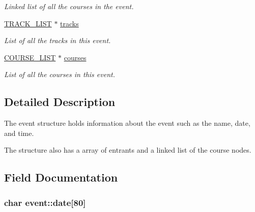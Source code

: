 \begin{DoxyCompactItemize}
\begin{DoxyCompactList}\small\item\em Linked list of all the courses in the event. \end{DoxyCompactList}\item 
\hypertarget{structevent_a8cdc68cd442a8388a43fd6ace1b60024}{\hyperlink{track_8h_a74548625073be9665a690d126e4daf4f}{T\-R\-A\-C\-K\-\_\-\-L\-I\-S\-T} $\ast$ \hyperlink{structevent_a8cdc68cd442a8388a43fd6ace1b60024}{tracks}}\label{structevent_a8cdc68cd442a8388a43fd6ace1b60024}

\begin{DoxyCompactList}\small\item\em List of all the tracks in this event. \end{DoxyCompactList}\item 
\hypertarget{structevent_a23dbac353abd557d37ce84982fb80f47}{\hyperlink{course_8h_aa6d3ed6acb1b755d50093c623587ee17}{C\-O\-U\-R\-S\-E\-\_\-\-L\-I\-S\-T} $\ast$ \hyperlink{structevent_a23dbac353abd557d37ce84982fb80f47}{courses}}\label{structevent_a23dbac353abd557d37ce84982fb80f47}

\begin{DoxyCompactList}\small\item\em List of all the courses in this event. \end{DoxyCompactList}\end{DoxyCompactItemize}



\subsection{Detailed Description}
The event structure holds information about the event such as the name, date, and time. 

The structure also has a array of entrants and a linked list of the course nodes. 

\subsection{Field Documentation}
\hypertarget{structevent_a83132208cc7419fd62d8c7cd93ba71bd}{
\subsubsection[{date}]{\setlength{\rightskip}{0pt plus 5cm}char event\-::date\mbox{[}80\mbox{]}}}\label{structevent_a83132208cc7419fd62d8c7cd93ba71bd}


